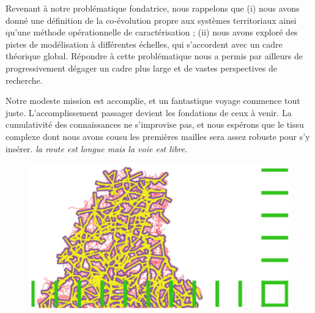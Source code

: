 Revenant à notre problématique fondatrice, nous rappelons que (i) nous avons donné une définition de la co-évolution propre aux systèmes territoriaux ainsi qu'une méthode opérationnelle de caractérisation ; (ii) nous avons exploré des pistes de modélisation à différentes échelles, qui s'accordent avec un cadre théorique global. Répondre à cette problématique nous a permis par ailleurs de progressivement dégager un cadre plus large et de vastes perspectives de recherche.


Notre modeste mission est accomplie, et un fantastique voyage commence tout juste. L'accomplissement passager devient les fondations de ceux à venir. La cumulativité des connaissances ne s'improvise pas, et nous espérons que le tissu complexe dont nous avons cousu les premières mailles sera assez robuste pour s'y insérer. \textit{la route est longue mais la voie est libre.}




\stars




















\begin{figure}
	\includegraphics[width=\textheight,angle=90]{Figures/Final/CL-artwork.jpg}
\end{figure}











